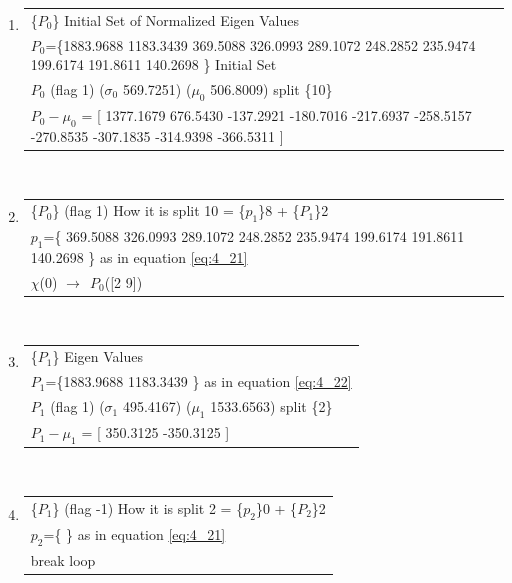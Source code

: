 
\begin{center} 
 \begin{enumerate} 
\item \begin{tabular}{ | p{15cm} | }\hline\{$P_{0}$\} Initial Set of Normalized Eigen Values \\ 
{$P_{0}$}=\{1883.9688 1183.3439 369.5088 326.0993 289.1072 248.2852 235.9474 199.6174 191.8611 140.2698 \} Initial Set \\ 
            $P_{0}$ (flag 1) ($\sigma_{0}$ 569.7251) ($\mu_{0}$ 506.8009) split \{10\} \\ 
$P_{0}-\mu_{0}$ = [ 1377.1679 676.5430 -137.2921 -180.7016 -217.6937 -258.5157 -270.8535 -307.1835 -314.9398 -366.5311 ]  \\ 
\hline 
\end{tabular}\\ \vspace{3mm}

\item \begin{tabular}{ | p{15cm} | }\hline\{$P_{0}$\} 
            (flag 1) How it is split 10 = \{$p_{1}$\}8 + \{$P_{1}$\}2\\ 
$p_{1}$=\{ 369.5088 326.0993 289.1072 248.2852 235.9474 199.6174 191.8611 140.2698 \} as in equation \ref{eq:4_21} \\ 
            $\chi$(0) $\longrightarrow~~P_{0}$([2 9]) \\ 
\hline 
\end{tabular}\\ \vspace{3mm}

\item \begin{tabular}{ | p{15cm} | }\hline\{$P_{1}$\} Eigen Values \\ 
{$P_{1}$}=\{1883.9688 1183.3439 \} as in equation \ref{eq:4_22} \\ 
            $P_{1}$ (flag 1) ($\sigma_{1}$ 495.4167) ($\mu_{1}$ 1533.6563) split \{2\} \\ 
$P_{1}-\mu_{1}$ = [ 350.3125 -350.3125 ]  \\ 
\hline 
\end{tabular}\\ \vspace{3mm}

\item \begin{tabular}{ | p{15cm} | }\hline\{$P_{1}$\} 
            (flag -1) How it is split 2 = \{$p_{2}$\}0 + \{$P_{2}$\}2\\ 
$p_{2}$=\{ \} as in equation \ref{eq:4_21} \\ 
            break loop \\ 
\hline 
\end{tabular}\\ \vspace{3mm}


\end{enumerate}
\end{center}
